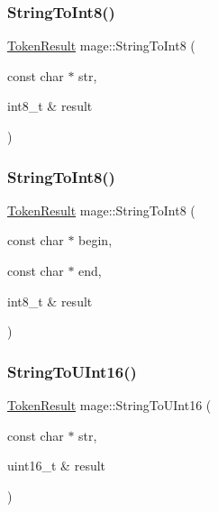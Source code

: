 \hypertarget{namespacemage_ab7990acb6c8fb8e5eb578ef173e601f9}{}\label{namespacemage_ab7990acb6c8fb8e5eb578ef173e601f9} 
\subsubsection{\texorpdfstring{String\+To\+Int8()}{StringToInt8()}\hspace{0.1cm}{\footnotesize\ttfamily [1/2]}}
{\footnotesize\ttfamily \hyperlink{namespacemage_a2178ba2411db5912f41b2e7698c2037d}{Token\+Result} mage\+::\+String\+To\+Int8 (\begin{DoxyParamCaption}\item[{const char $\ast$}]{str,  }\item[{int8\+\_\+t \&}]{result }\end{DoxyParamCaption})}

\hypertarget{namespacemage_a0bd81bf259563dd9de793ada42405c95}{}\label{namespacemage_a0bd81bf259563dd9de793ada42405c95} 
\subsubsection{\texorpdfstring{String\+To\+Int8()}{StringToInt8()}\hspace{0.1cm}{\footnotesize\ttfamily [2/2]}}
{\footnotesize\ttfamily \hyperlink{namespacemage_a2178ba2411db5912f41b2e7698c2037d}{Token\+Result} mage\+::\+String\+To\+Int8 (\begin{DoxyParamCaption}\item[{const char $\ast$}]{begin,  }\item[{const char $\ast$}]{end,  }\item[{int8\+\_\+t \&}]{result }\end{DoxyParamCaption})}

\hypertarget{namespacemage_aa1be9dbfa0799457b0de019d451cd5ca}{}\label{namespacemage_aa1be9dbfa0799457b0de019d451cd5ca} 
\subsubsection{\texorpdfstring{String\+To\+U\+Int16()}{StringToUInt16()}\hspace{0.1cm}{\footnotesize\ttfamily [1/2]}}
{\footnotesize\ttfamily \hyperlink{namespacemage_a2178ba2411db5912f41b2e7698c2037d}{Token\+Result} mage\+::\+String\+To\+U\+Int16 (\begin{DoxyParamCaption}\item[{const char $\ast$}]{str,  }\item[{uint16\+\_\+t \&}]{result }\end{DoxyParamCaption})}

